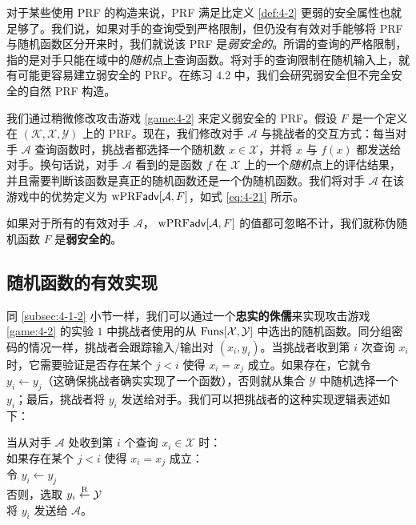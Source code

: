 \begin{snote}[弱安全的伪随机函数。]
对于某些使用 PRF 的构造来说，PRF 满足比定义 \ref{def:4-2} 更弱的安全属性也就足够了。我们说，如果对手的查询受到严格限制，但仍没有有效对手能够将 PRF 与随机函数区分开来时，我们就说该 PRF 是\emph{弱安全的}。所谓的查询的严格限制，指的是对手只能在域中的\emph{随机}点上查询函数。将对手的查询限制在随机输入上，就有可能更容易建立弱安全的 PRF。在练习 4.2 中，我们会研究弱安全但不完全安全的自然 PRF 构造。

我们通过稍微修改攻击游戏 \ref{game:4-2} 来定义弱安全的 PRF。假设 $F$ 是一个定义在 $(\mathcal{K},\mathcal{X},\mathcal{Y})$ 上的 PRF。现在，我们修改对手 $\mathcal{A}$ 与挑战者的交互方式：每当对手 $\mathcal{A}$ 查询函数时，挑战者都选择一个随机数 $x\in\mathcal{X}$，并将 $x$ 与 $f(x)$ 都发送给对手。换句话说，对手 $\mathcal{A}$ 看到的是函数 $f$ 在 $\mathcal{X}$ 上的一个\emph{随机}点上的评估结果，并且需要判断该函数是真正的随机函数还是一个伪随机函数。我们将对手 $\mathcal{A}$ 在该游戏中的优势定义为 ${\rm wPRF\mathsf{adv}}[\mathcal{A}, F]$，如式 \ref{eq:4-21} 所示。
\end{snote}

\begin{definition}\label{def:4-3}
如果对于所有的有效对手 $\mathcal{A}$， ${\rm wPRF\mathsf{adv}}[\mathcal{A}, F]$ 的值都可忽略不计，我们就称伪随机函数 $F$ 是\textbf{弱安全的}。
\end{definition}

\subsection{随机函数的有效实现}\label{subsec:4-4-2}

同 \ref{subsec:4-1-2} 小节一样，我们可以通过一个\textbf{忠实的侏儒}来实现攻击游戏 \ref{game:4-2} 的实验 $1$ 中挑战者使用的从 ${\rm Funs}[\mathcal{X},\mathcal{Y}]$ 中选出的随机函数。同分组密码的情况一样，挑战者会跟踪输入/输出对 $(x_i,y_i)$。当挑战者收到第 $i$ 次查询 $x_i$ 时，它需要验证是否存在某个 $j < i$ 使得 $x_i=x_j$ 成立。如果存在，它就令 $y_i\leftarrow y_j$（这确保挑战者确实实现了一个函数），否则就从集合 $\mathcal{Y}$ 中随机选择一个 $y_i$；最后，挑战者将 $y_i$ 发送给对手。我们可以把挑战者的这种实现逻辑表述如下：

\vspace{5pt}

\hspace*{5pt} 当从对手 $\mathcal{A}$ 处收到第 $i$ 个查询 $x_i\in\mathcal{X}$ 时：\\
\hspace*{50pt} 如果存在某个 $j<i$ 使得 $x_i=x_j$ 成立：\\
\hspace*{75pt} 令 $y_i\leftarrow y_j$\\
\hspace*{75pt} 否则，选取 $y_i\overset{\rm R}\leftarrow\mathcal{Y}$\\
\hspace*{50pt} 将 $y_i$ 发送给 $\mathcal{A}$。\\

